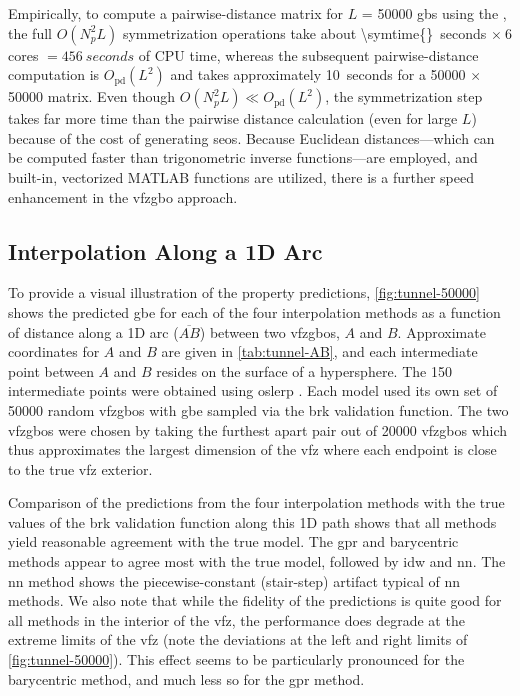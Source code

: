\documentclass[final,twocolumn,12pt]{elsarticle}
\begin{document}
Empirically, to compute a pairwise-distance matrix for $L$ = \num{50000} \glspl{gb} using the \vfzorepo{} \cite{bairdFiveDegreeofFreedom5DOF2020}, the full $O(N_p^2L)$ symmetrization operations take about \SI{\symtime{}}{seconds} $\times\ 6$ cores $= \SI{456}{seconds}$ of CPU time, whereas the subsequent pairwise-distance computation is $O_{\text{pd}}(L^2)$ and takes approximately \SI{10}{seconds} for a \num{50000} $\times$ \num{50000} matrix. Even though $O(N_p^2L) \ll O_{\text{pd}}(L^2)$, the symmetrization step takes far more time than the pairwise distance calculation (even for large $L$) because of the cost of generating \glspl{seo}. Because Euclidean distances---which can be computed faster than trigonometric inverse functions---are employed, and built-in, vectorized MATLAB functions are utilized, there is a further speed enhancement in the \gls{vfzgbo} approach. %
%
\subsection{Interpolation Along a 1D Arc} \label{sec:results:vis:arc}
%
To provide a visual illustration of the property predictions, \cref{fig:tunnel-50000} shows the predicted \gls{gbe} for each of the four interpolation methods as a function of distance along a 1D arc ($\overline{AB}$) between two \glspl{vfzgbo}, $A$ and $B$. Approximate coordinates for $A$ and $B$ are given in \cref{tab:tunnel-AB}, and each intermediate point between $A$ and $B$ resides on the surface of a hypersphere. The \num{150} intermediate points were obtained using \gls{oslerp} \cite{francisGeodesicOctonionMetric2019}. Each model used its own set of \num{50000} random \inpt{} \glspl{vfzgbo} with \gls{gbe} sampled via the \gls{brk} validation function. The two \glspl{vfzgbo} were chosen by taking the furthest apart pair out of \num{20000} \glspl{vfzgbo} which thus approximates the largest dimension of the \gls{vfz} where each endpoint is close to the true \gls{vfz} exterior.

Comparison of the predictions from the four interpolation methods with the true values of the \gls{brk} validation function along this 1D path shows that all methods yield reasonable agreement with the true model. The \gls{gpr} and barycentric methods appear to agree most with the true model, followed by \gls{idw} and \gls{nn}. The \gls{nn} method shows the piecewise-constant (stair-step) artifact typical of \gls{nn} methods. We also note that while the fidelity of the predictions is quite good for all methods in the interior of the \gls{vfz}, the performance does degrade at the extreme limits of the \gls{vfz} (note the deviations at the left and right limits of \cref{fig:tunnel-50000}). This effect seems to be particularly pronounced for the barycentric method, and much less so for the \gls{gpr} method.
\end{document}
